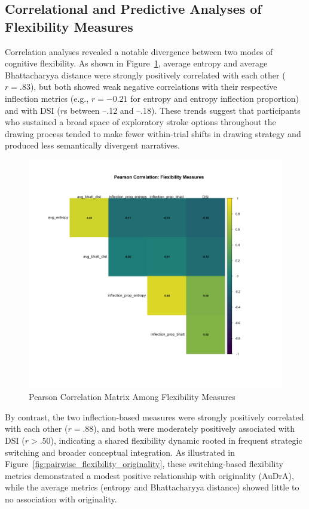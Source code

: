 \documentclass[../MA_Thesis.tex]{subfiles}
\begin{document}
\subsection*{Correlational and Predictive Analyses of Flexibility Measures}

Correlation analyses revealed a notable divergence between two modes of cognitive flexibility. As shown in Figure~\ref{fig:cor_heatmap}, average entropy and average Bhattacharyya distance were strongly positively correlated with each other ($r = .83$), but both showed weak negative correlations with their respective inflection metrics (e.g., $r = -0.21$ for entropy and entropy inflection proportion) and with DSI ($r$s between –.12 and –.18). These trends suggest that participants who sustained a broad space of exploratory stroke options throughout the drawing process tended to make fewer within-trial shifts in drawing strategy and produced less semantically divergent narratives.

\begin{figure}[H]
  \centering
  \includegraphics[width=\textwidth]{../analysis/results/main_results/correlation/correlation_heatmap_flexibility.png}
  \caption{Pearson Correlation Matrix Among Flexibility Measures}
  \label{fig:cor_heatmap}
\end{figure}

By contrast, the two inflection-based measures were strongly positively correlated with each other ($r = .88$), and both were moderately positively associated with DSI ($r > .50$), indicating a shared flexibility dynamic rooted in frequent strategic switching and broader conceptual integration. As illustrated in Figure~\ref{fig:pairwise_flexibility_originality}, these switching-based flexibility metrics demonstrated a modest positive relationship with originality (AuDrA), while the average metrics (entropy and Bhattacharyya distance) showed little to no association with originality.
\end{document}
